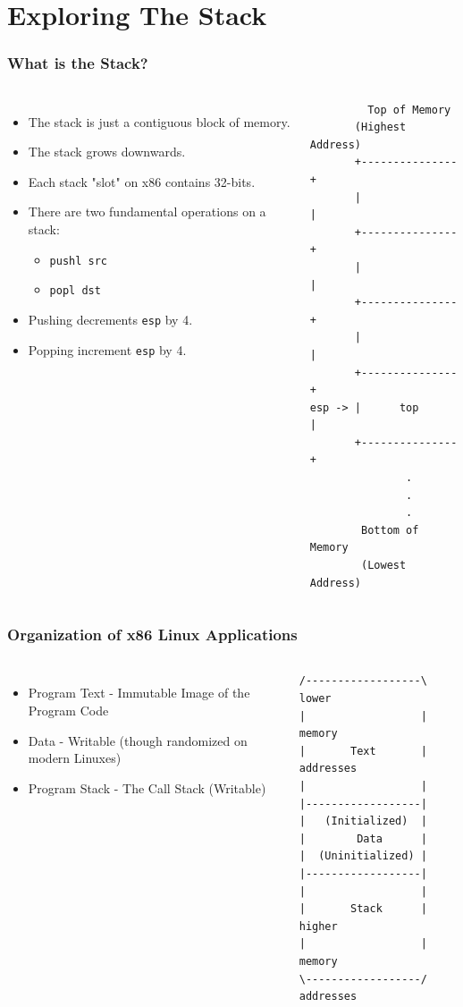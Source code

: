 \documentclass{beamer}
\begin{document}
\section{Exploring The Stack}
\begin{frame}[fragile]
    \frametitle{What is the Stack?}
    \begin{columns}
    \begin{itemize}[<+->]
        \item The stack is just a contiguous block of memory.
        \item The stack grows downwards.  
        \item Each stack "slot" on x86 contains 32-bits.
        \item There are two fundamental operations on a stack:
        \begin{itemize}
            \item {\tt pushl src}
            \item {\tt popl dst}
        \end{itemize}
        \item Pushing decrements {\tt esp} by 4.
        \item Popping increment {\tt esp} by 4.
    \end{itemize}
    {\scriptsize
    \begin{verbatim}
         Top of Memory
       (Highest Address)
       +---------------+
       |               |
       +---------------+
       |               |
       +---------------+
       |               |
       +---------------+
esp -> |      top      |
       +---------------+
               .
               .
               .
        Bottom of Memory
        (Lowest Address)
    \end{verbatim}
    }
    \end{columns}
\end{frame}

\begin{frame}[fragile]
    \frametitle{Organization of x86 Linux Applications}
    \begin{columns}
    \begin{itemize}[<+->]
        \item Program Text - Immutable Image of the Program Code
        \item Data - Writable (though randomized on modern Linuxes)
        \item Program Stack - The Call Stack  (Writable)
    \end{itemize}
    {\scriptsize
    \begin{verbatim}
/------------------\  lower
|                  |  memory
|       Text       |  addresses
|                  |
|------------------|
|   (Initialized)  |
|        Data      |
|  (Uninitialized) |
|------------------|
|                  |
|       Stack      |  higher
|                  |  memory
\------------------/  addresses
\end{verbatim}}
    \end{columns}
\end{frame}
\end{document}
